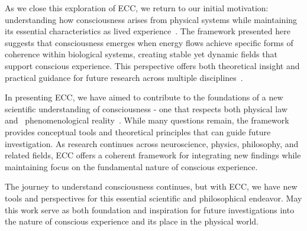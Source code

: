 As we close this exploration of ECC, we return to our initial motivation: understanding how consciousness arises from physical systems while maintaining its essential characteristics as lived experience~\cite{goff2019galileo, thompson2010mind}. The framework presented here suggests that consciousness emerges when energy flows achieve specific forms of coherence within biological systems, creating stable yet dynamic fields that support conscious experience. This perspective offers both theoretical insight and practical guidance for future research across multiple disciplines~\cite{thompson2014waking, bosl2025dynamical}.

In presenting ECC, we have aimed to contribute to the foundations of a new scientific understanding of consciousness - one that respects both physical law and~ phenomenological reality~\cite{dennett2017bacteria, haken2013principles}. While many questions remain, the framework provides conceptual tools and theoretical principles that can guide future investigation. As research continues across neuroscience, physics, philosophy, and related fields, ECC offers a coherent framework for integrating new findings while maintaining focus on the fundamental nature of conscious experience.

The journey to understand consciousness continues, but with ECC, we have new tools and perspectives for this essential scientific and philosophical endeavor. May this work serve as both foundation and inspiration for future investigations into the nature of conscious experience and its place in the physical world.